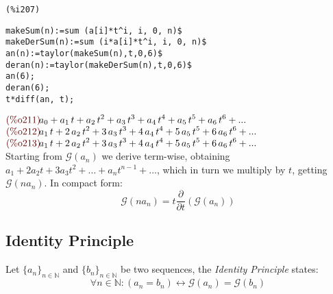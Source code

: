 \noindent
\begin{minipage}[t]{8ex}{\color{red}\bf
\begin{verbatim}
(%i207)
\end{verbatim}}
\end{minipage}
\begin{minipage}[t]{\textwidth}{\color{blue}
\begin{verbatim}
makeSum(n):=sum (a[i]*t^i, i, 0, n)$
makeDerSum(n):=sum (i*a[i]*t^i, i, 0, n)$
an(n):=taylor(makeSum(n),t,0,6)$
deran(n):=taylor(makeDerSum(n),t,0,6)$
an(6);
deran(6);
t*diff(an, t);
\end{verbatim}}
\end{minipage}
\begin{math}\displaystyle
\parbox{8ex}{\color{labelcolor}(\%o211) }
{a}_{0}+{a}_{1}\,t+{a}_{2}\,{t}^{2}+{a}_{3}\,{t}^{3}+{a}_{4}\,{t}^{4}+{a}_{5}\,{t}^{5}+{a}_{6}\,{t}^{6}+...
\end{math}\\
\begin{math}\displaystyle
\parbox{8ex}{\color{labelcolor}(\%o212) }
{a}_{1}\,t+2\,{a}_{2}\,{t}^{2}+3\,{a}_{3}\,{t}^{3}+4\,{a}_{4}\,{t}^{4}+5\,{a}_{5}\,{t}^{5}+6\,{a}_{6}\,{t}^{6}+...
\end{math}\\
\begin{math}\displaystyle
\parbox{8ex}{\color{labelcolor}(\%o213) }
{a}_{1}\,t+2\,{a}_{2}\,{t}^{2}+3\,{a}_{3}\,{t}^{3}+4\,{a}_{4}\,{t}^{4}+5\,{a}_{5}\,{t}^{5}+6\,{a}_{6}\,{t}^{6}+...
\end{math}\\

Starting from $\mathcal{G} (a_n)$ we derive term-wise, obtaining $ a_1
+ 2a_2 t + 3a_3 t^2 + \ldots + a_n t^{n-1} + \ldots $, which in turn
we multiply by $t$, getting $\mathcal{G} (na_n)$. In compact form:
\begin{displaymath}
  \mathcal{G}(n a_n) = t \frac{\partial}{\partial
    t}\left( \mathcal{G} (a_n) \right)
\end{displaymath}

\subsection{Identity Principle}

Let $\{a_n\}_{n\in\mathbb{N} } $ and $\{b_n\}_{n\in\mathbb{N} } $ be
two sequences, the \emph{Identity Principle} states:
\begin{displaymath}
  \forall n \in \mathbb{N}: \left( a_n = b_n\right) \leftrightarrow
    \mathcal{G} (a_n) = \mathcal{G} (b_n)
\end{displaymath}

